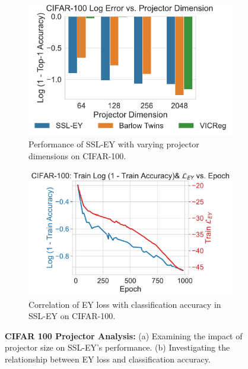 \begin{figure}[H]
    \begin{subfigure}[b]{0.47\textwidth}
        \centering
        \includegraphics[width=\textwidth]{figures/SSL/cifar100_proj_dim_log_error}
        \caption{Performance of SSL-EY with varying projector dimensions on CIFAR-100.}
        \label{fig:ssl_projector_dimensions_100}
    \end{subfigure}
    \hfill
    \begin{subfigure}[b]{0.47\textwidth}
        \centering
        \includegraphics[width=\textwidth]{figures/SSL/cifar100_corr_vs_acc_log_error}
        \caption{Correlation of EY loss with classification accuracy in SSL-EY on CIFAR-100.}
        \label{fig:ssl_learning_curve_cifar100_vs_corr}
    \end{subfigure}
    \caption{\textbf{CIFAR 100 Projector Analysis:} (a) Examining the impact of projector size on SSL-EY's performance. (b) Investigating the relationship between EY loss and classification accuracy.}
    \label{fig:ssl_projector_cifar_100}
\end{figure}

